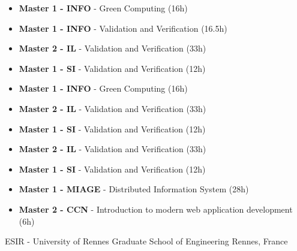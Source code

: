 
{\begin{itemize}
    \item \textbf{Master 1 - INFO} - Green Computing  (16h)
    \item \textbf{Master 1 - INFO} - Validation and Verification  (16.5h)
\end{itemize}}

{\begin{itemize}
    \item \textbf{Master 2 - IL} - Validation and Verification (33h)
    \item \textbf{Master 1 - SI} - Validation and Verification (12h)
    \item \textbf{Master 1 - INFO} - Green Computing  (16h)
\end{itemize}}

{\begin{itemize}
    \item \textbf{Master 2 - IL} - Validation and Verification (33h)
    \item \textbf{Master 1 - SI} - Validation and Verification (12h)
\end{itemize}}

{\begin{itemize}
    \item \textbf{Master 2 - IL} - Validation and Verification (33h)
    \item \textbf{Master 1 - SI} - Validation and Verification (12h)
\end{itemize}}
{\begin{itemize}
    \item \textbf{Master 1 - MIAGE} - Distributed Information System (28h)
    \item \textbf{Master 2 - CCN} - Introduction to modern web application development (6h) 
\end{itemize}}
{ESIR - University of Rennes Graduate School of Engineering }{Rennes, France}
{}
